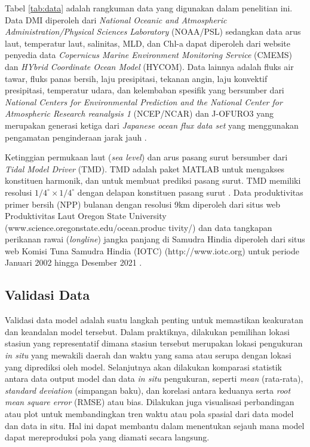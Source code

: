 \begin{spacing}{1.5}
	Tabel \ref*{tab:data} adalah rangkuman data yang digunakan dalam penelitian ini. Data DMI diperoleh dari \textit{National Oceanic and Atmospheric Administration/Physical Sciences Laboratory} (NOAA/PSL) \cite{Saji2003} sedangkan data arus laut, temperatur laut, salinitas, MLD, dan Chl-a dapat diperoleh dari website penyedia data \textit{Copernicus Marine Environment Monitoring Service} (CMEMS)\cite{Lellouche2018} dan \textit{HYbrid Coordinate Ocean Model} (HYCOM)\cite{Chassignet2007}. Data lainnya adalah fluks air tawar, fluks panas bersih, laju presipitasi, tekanan angin, laju konvektif presipitasi, temperatur udara, dan kelembaban spesifik yang bersumber dari \textit{National Centers for Environmental Prediction and the National Center for Atmospheric Research reanalysis 1} (NCEP/NCAR) \cite{Kalnay1996} dan J-OFURO3 yang merupakan generasi ketiga dari \textit{Japanese ocean flux data set} yang menggunakan pengamatan penginderaan jarak jauh \cite{Tomita2019}. 
	
	Ketinggian permukaan laut (\textit{sea level}) dan arus pasang surut bersumber dari \textit{Tidal Model Driver }(TMD). TMD adalah paket MATLAB untuk mengakses konstituen harmonik, dan untuk membuat prediksi pasang surut. TMD memiliki resolusi $1/4^\circ \times 1/4^\circ$ dengan delapan konstituen pasang surut \cite{padman2005tide}. Data produktivitas primer bersih (NPP) bulanan dengan resolusi 9km diperoleh dari situs web Produktivitas Laut Oregon State University (www.science.oregonstate.edu/ocean.produc tivity/) dan data tangkapan perikanan rawai (\textit{longline}) jangka panjang di Samudra Hindia diperoleh dari situs web Komisi Tuna Samudra Hindia (IOTC) (http://www.iotc.org) untuk periode Januari 2002 hingga Desember 2021 \cite{Lan2013}.
	
	\subsection[Validasi Data]{Validasi Data}
	Validasi data model adalah suatu langkah penting untuk memastikan keakuratan dan keandalan model tersebut. Dalam praktiknya, dilakukan pemilihan lokasi stasiun yang representatif dimana stasiun tersebut merupakan lokasi pengukuran \textit{in situ} yang mewakili daerah dan waktu yang sama atau serupa dengan lokasi yang diprediksi oleh model. Selanjutnya akan dilakukan komparasi statistik antara data output model dan data \textit{in situ} pengukuran, seperti \textit{mean} (rata-rata), \textit{standard deviation} (simpangan baku), dan korelasi antara keduanya serta \textit{root mean square error} (RMSE) atau bias. Dilakukan juga visualisasi perbandingan atau plot untuk membandingkan tren waktu atau pola spasial dari data model dan data in situ. Hal ini dapat membantu dalam menentukan sejauh mana model dapat mereproduksi pola yang diamati secara langsung.
	

\end{spacing}
